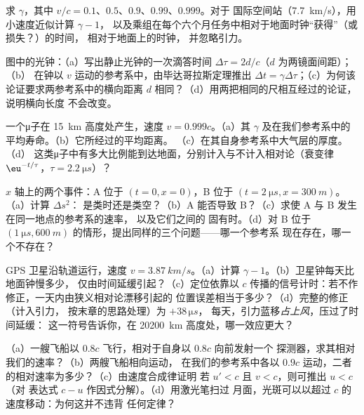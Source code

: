\begin{exercise}[$\star$]\label{exo:b3:relativistic-kinematics:1}
求 $\gamma$，其中 $v/c = 0.1$、$0.5$、$0.9$、$0.99$、$0.999$。对于
国际空间站（\qty{7.7}{km/s}），用小速度近似计算 $\gamma - 1$，
以及乘组在每个六个月任务中相对于地面时钟“获得”（或损失？）的时间，
相对于地面上的时钟，
并忽略引力。
\end{exercise}

\begin{exercise}[$\star$]\label{exo:b3:relativistic-kinematics:2}
图中的光钟：（a）写出静止光钟的一次滴答时间 $\Delta\tau =
2d/c$（$d$ 为两镜面间距）；（b）
在钟以 $v$ 运动的参考系中，由毕达哥拉斯定理推出 $\Delta t =
\gamma\Delta\tau$；（c）为何该论证要求两参考系中的横向距离
$d$ 相同？（d）用两把相同的尺相互经过的论证，
说明横向长度
不会改变。
\end{exercise}

\begin{exercise}[$\star$]\label{exo:b3:relativistic-kinematics:3}
一个μ子在 \qty{15}{km} 高度处产生，速度 $v = 0.999c$。（a）其
$\gamma$ 及在我们参考系中的平均寿命。（b）它所经过的平均距离。
（c）在其自身参考系中大气层的厚度。（d）
这类μ子中有多大比例能到达地面，分别计入与不计入相对论（衰变律
$\eu^{-t/\tau}$，$\tau = \qty{2.2}{\micro s}$）？
\end{exercise}

\begin{exercise}[$\star$]\label{exo:b3:relativistic-kinematics:4}
$x$ 轴上的两个事件：A 位于 $(t = 0, x = 0)$，B 位于 $(t =
\qty{2}{\micro s}, x = \qty{300}{m})$。（a）计算 $\Delta s^2$：
是类时还是类空？（b）A 能否导致 B？（c）求使 A 与 B 发生在同一地点的参考系的速率，
以及它们之间的
固有时。（d）对 B 位于
$(\qty{1}{\micro s}, \qty{600}{m})$ 的情形，提出同样的三个问题——哪一个参考系
现在存在，哪一个不存在？
\end{exercise}

\begin{exercise}[$\star\star$]\label{exo:b3:relativistic-kinematics:5}
GPS 卫星沿轨道运行，速度 $v = \qty{3.87}{km/s}$。（a）计算 $\gamma -
1$。（b）卫星钟每天比地面钟慢多少，
仅由时间延缓引起？（c）定位依靠以
$c$ 传播的信号计时：若不作修正，一天内由狭义相对论漂移引起的
位置误差相当于多少？（d）完整的修正（计入引力，
按末章的思路处理）为 $+38\,\unit{\micro s}$，
每天，引力蓝移\emph{占上风}，压过了时间延缓：
这一符号告诉你，在 
\qty{20200}{km} 高度处，哪一效应更大？
\end{exercise}

\begin{exercise}[$\star\star$]\label{exo:b3:relativistic-kinematics:6}
（a）一艘飞船以 $0.8c$ 飞行，相对于自身以 $0.8c$ 向前发射一个
探测器，求其相对我们的速率？（b）两艘飞船相向运动，
在我们的参考系中各以 $0.9c$ 运动，二者的相对速率为多少？（c）由速度合成律证明
若 $u' < c$ 且 $v < c$，则可推出 $u < c$（对
表达式 $c - u$ 作因式分解）。（d）用激光笔扫过
月面，光斑可以以超过 $c$ 的速度移动：为何这并不违背
任何定律？
\end{exercise}

